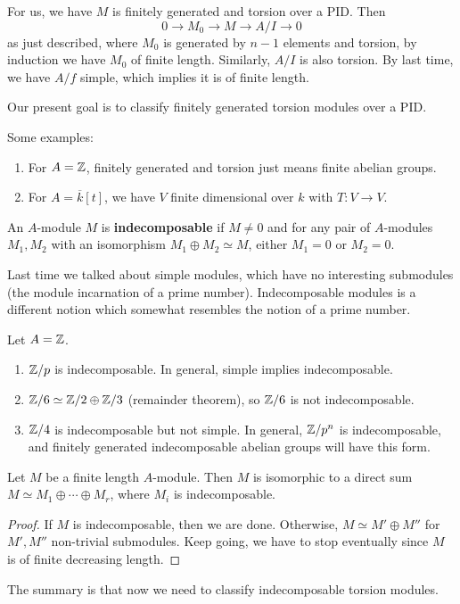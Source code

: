 For us, we have $M$ is finitely generated and torsion over a PID. Then \[
0 \to  M_0 \to M \to  A / I \to 0
\] as just described, where $M_0$ is generated by $n-1$ elements and torsion, by induction we have $M_0$ of finite length. Similarly, $A /I$ is also torsion. By last time, we have $A / f$ simple, which implies it is of finite length.

Our present goal is to classify finitely generated torsion modules over a PID.
\begin{example}
    Some examples:
    \begin{enumerate}[label=(\arabic*)]
    \setlength\itemsep{-.2em}
\item For $A =\mathbb{Z}$, finitely generated and torsion just means finite abelian groups.
\item For $A = \overline{k}[t]$, we have $V $ finite dimensional over $k$ with $T \colon V \to V$.
    \end{enumerate}
\end{example}
\begin{definition}[]
    An $A$-module $M$ is \textbf{indecomposable} if $M\neq 0$ and for any pair of $A$-modules $M_1,M_2$ with an isomorphism $M_1 \oplus M_2 \simeq M$, either $M_1=0$ or $M_2=0$.
\end{definition}
Last time we talked about simple modules, which have no interesting submodules (the module incarnation of a prime number). Indecomposable modules is a different notion which somewhat resembles the notion of a prime number.
\begin{example}
    Let $A= \mathbb{Z}$.
    \begin{enumerate}[label=(\arabic*)]
    \setlength\itemsep{-.2em}
        \item $\mathbb{Z} /p$ is indecomposable. In general, simple implies indecomposable.
        \item $\mathbb{Z} / 6 \simeq  \mathbb{Z} /2 \oplus \mathbb{Z} /3$ (remainder theorem), so $\mathbb{Z} /6$ is not indecomposable.
        \item $\mathbb{Z} /4$ is indecomposable but not simple. In general, $\mathbb{Z} / p^n $ is indecomposable, and finitely generated indecomposable abelian groups will have this form.
    \end{enumerate}
\end{example}
\begin{lemma}
    Let $M$ be a finite length $A$-module. Then $M$ is isomorphic to a direct sum $M \simeq M_1 \oplus \cdots \oplus M_r$, where $M_i $ is indecomposable.
\end{lemma}
\begin{proof}
    If $M$ is indecomposable, then we are done. Otherwise, $M \simeq M' \oplus M''$ for $M',M''$ non-trivial submodules. Keep going, we have to stop eventually since $M $ is of finite decreasing length.
\end{proof}
The summary is that now we need to classify indecomposable torsion modules.
